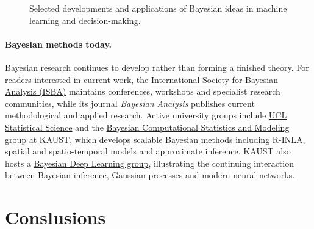 \begin{figure}[H]

\caption{Selected developments and applications of Bayesian ideas in
machine learning and decision-making.}
\label{fig:bayes-learning-tree}
\end{figure}


\paragraph{Bayesian methods today.}

Bayesian research continues to develop rather than forming a finished theory. For readers interested in current work, the \href{https://bayesian.org/}{International Society for Bayesian Analysis (ISBA)} maintains conferences, workshops and specialist research communities, while its journal \emph{Bayesian Analysis} publishes current methodological and applied research. Active university groups include
\href{https://www.ucl.ac.uk/mathematical-physical-sciences/statistics/research} {UCL Statistical Science} and the
\href{https://bayescomp.kaust.edu.sa/} {Bayesian Computational Statistics and Modeling group at KAUST}, which develops scalable Bayesian methods including R-INLA, spatial and spatio-temporal models and approximate inference. KAUST also hosts a \href{https://stat.kaust.edu.sa/research-groups}{Bayesian Deep Learning group}, illustrating the continuing interaction between Bayesian inference, Gaussian processes and modern neural networks.


\section{Conslusions}

